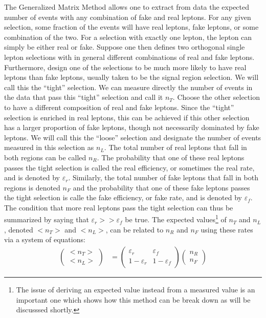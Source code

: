 The Generalized Matrix Method allows one to extract from data the expected
number of events with any combination of fake and real leptons.
For any given selection, some fraction of the events will have 
real leptons, fake leptons, or some combination of the two.
For a selection with exactly one lepton, the lepton 
can simply be either real or fake.  Suppose one then defines
two orthogonal single lepton
selections with in general different combinations of real and fake leptons.
Furthermore, design one of the selections to be much more likely to have
real leptons than fake leptons, usually taken 
to be the signal region selection. We will call this the ``tight'' selection.
We can measure directly the number of events in the data that
pass this ``tight'' selection and call it $n_T$. Choose the other selection
to have a different composition of real and fake leptons. Since the 
``tight'' selection is enriched in real leptons, this can be achieved
if this other selection has a larger proportion of fake leptons, though
not necessarily dominated by fake leptons. We will call this the
``loose'' selection and designate the number of events measured
in this selection as $n_L$. The total number of real leptons that fall in 
both regions can be called $n_R$. The probability that one of these
real leptons passes the tight selection is called the 
real efficiency, or sometimes the real rate, and is denoted by 
$\varepsilon_r$. Similarly, the total number of fake leptons 
that fall in both regions is denoted $n_F$ and the probability 
that one of these fake leptons passes the tight selection is 
calle the fake efficiency, or fake rate, and is 
denoted by $\varepsilon_f$. The condition that
more real leptons pass the tight selection can thus be summarized by saying
that $\varepsilon_r>>\varepsilon_f$ be true.
The expected values\footnote{The issue
of deriving an expected value instead from a measured value
is an important one which shows how this method can be break down 
as will be discusssed shortly.} of  $n_T$ and $n_L$,
denoted $<n_T>$ and $<n_L>$,
can be related to $n_R$ and $n_F$ using these rates via a system of
equations:
\begin{align}
  \label{eq:mxm_single}
  \begin{pmatrix} <n_T> \\ <n_L> \end{pmatrix} 
  &= 
  \begin{pmatrix}
  \varepsilon_r & \varepsilon_f \\ 1-\varepsilon_r & 1-\varepsilon_f
  \end{pmatrix} 
  \begin{pmatrix} n_R \\ n_F \end{pmatrix}
\end{align}
